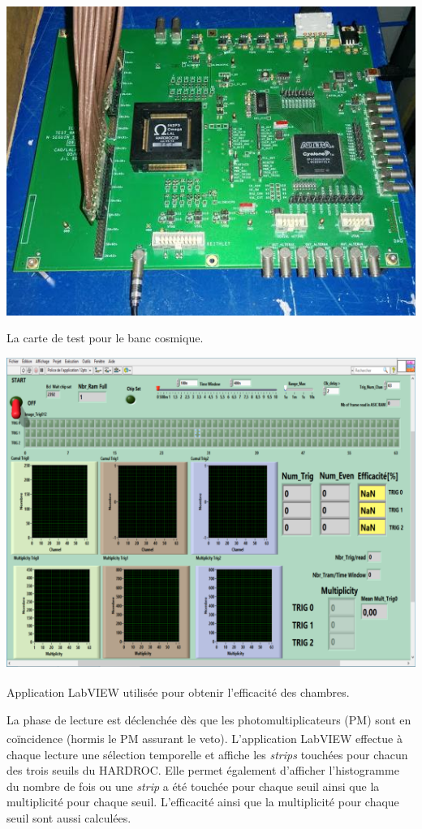 \noindent
\begin{minipage}[t]{.48\textwidth}
	\noindent
	\centering
	\includegraphics[width=1\textwidth]{GLA/carte.jpg}
	\captionsetup{type=figure}\caption{La carte de test pour le banc cosmique.}
	\label{carte}
\end{minipage}%
\hfill
\begin{minipage}[t]{.48\textwidth}
	\noindent
	\centering
	\includegraphics[width=1\textwidth]{GLA/labview.png}
	\captionsetup{type=figure}\caption{Application LabVIEW\textsuperscript{\textregistered} utilisée pour obtenir l'efficacité des chambres.}
	\label{labview}
\end{minipage}

La phase de lecture est déclenchée dès que les photomultiplicateurs (PM) sont en coïncidence (hormis le PM assurant le veto). L'application LabVIEW\textsuperscript{\textregistered} effectue à chaque lecture une sélection temporelle et affiche les \textit{strips} touchées pour chacun des trois seuils du HARDROC. Elle permet également d'afficher l'histogramme du nombre de fois ou une \textit{strip} a été touchée pour chaque seuil ainsi que la multiplicité pour chaque seuil. L'efficacité ainsi que la multiplicité pour chaque seuil sont aussi calculées.

